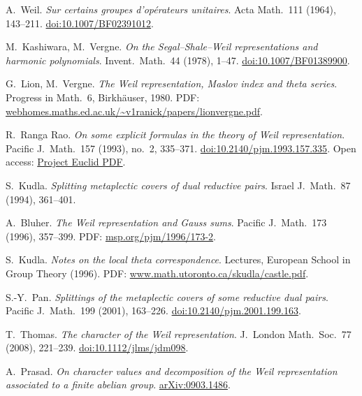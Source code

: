 \documentclass[11pt,letterpaper]{article}
\theoremstyle{plain}
\theoremstyle{definition}
\begin{document}
\begin{description}[leftmargin=1.6em,labelindent=0pt,itemsep=2pt]
\item[{[Weil1964]}] A.~Weil. \emph{Sur certains groupes d'op\'erateurs unitaires}. Acta Math.\ 111 (1964), 143--211. \href{https://doi.org/10.1007/BF02391012}{doi:10.1007/BF02391012}.
\item[{[KV1978]}] M.~Kashiwara, M.~Vergne. \emph{On the Segal--Shale--Weil representations and harmonic polynomials}. Invent.\ Math.\ 44 (1978), 1--47. \href{https://doi.org/10.1007/BF01389900}{doi:10.1007/BF01389900}.
\item[{[LV1980]}] G.~Lion, M.~Vergne. \emph{The Weil representation, Maslov index and theta series}. Progress in Math.\ 6, Birkh\"auser, 1980. PDF: \href{https://webhomes.maths.ed.ac.uk/~v1ranick/papers/lionvergne.pdf}{webhomes.maths.ed.ac.uk/\textasciitilde{}v1ranick/papers/lionvergne.pdf}.
\item[{[Rao1993]}] R.~Ranga Rao. \emph{On some explicit formulas in the theory of Weil representation}. Pacific J.\ Math.\ 157 (1993), no.\ 2, 335--371. \href{https://doi.org/10.2140/pjm.1993.157.335}{doi:10.2140/pjm.1993.157.335}. Open access: \href{https://projecteuclid.org/journals/pacific-journal-of-mathematics/volume-157/issue-2/On-some-explicit-formulas-in-the-theory-of-Weil-representation/pjm/1102634748.pdf}{Project Euclid PDF}.
\item[{[Kudla1994]}] S.~Kudla. \emph{Splitting metaplectic covers of dual reductive pairs}. Israel J.\ Math.\ 87 (1994), 361--401.
\item[{[Bluher1996]}] A.~Bluher. \emph{The Weil representation and Gauss sums}. Pacific J.\ Math.\ 173 (1996), 357--399. PDF: \href{https://msp.org/pjm/1996/173-2/pjm-v173-n2-p04-s.pdf}{msp.org/pjm/1996/173-2}.
\item[{[Kudla1996]}] S.~Kudla. \emph{Notes on the local theta correspondence}. Lectures, European School in Group Theory (1996). PDF: \href{https://www.math.utoronto.ca/skudla/castle.pdf}{www.math.utoronto.ca/skudla/castle.pdf}.
\item[{[Pan2001]}] S.-Y.~Pan. \emph{Splittings of the metaplectic covers of some reductive dual pairs}. Pacific J.\ Math.\ 199 (2001), 163--226. \href{https://doi.org/10.2140/pjm.2001.199.163}{doi:10.2140/pjm.2001.199.163}.
\item[{[Thomas2008]}] T.~Thomas. \emph{The character of the Weil representation}. J.\ London Math.\ Soc.\ 77 (2008), 221--239. \href{https://doi.org/10.1112/jlms/jdm098}{doi:10.1112/jlms/jdm098}.
\item[{[Prasad2009]}] A.~Prasad. \emph{On character values and decomposition of the Weil representation associated to a finite abelian group}. \href{https://arxiv.org/abs/0903.1486}{arXiv:0903.1486}.

\end{description}
\end{document}
